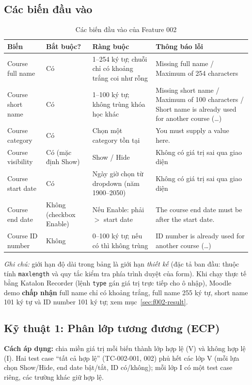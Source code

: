 \subsection{Các biến đầu vào}
\begin{table}[H]
\centering\small
\begin{tabular}{|L{2.8cm}|L{1.8cm}|L{5.0cm}|L{4.4cm}|}
\hline
{}\textbf{Biến} & \textbf{Bắt buộc?} & \textbf{Ràng buộc} & \textbf{Thông báo lỗi} \\ \hline
Course full name & Có & 1--254 ký tự; chuỗi chỉ có khoảng trắng coi như rỗng & Missing full name / Maximum of 254 characters \\ \hline
Course short name & Có & 1--100 ký tự; không trùng khóa học khác & Missing short name / Maximum of 100 characters / Short name is already used for another course (\dots) \\ \hline
Course category & Có & Chọn một category tồn tại & You must supply a value here. \\ \hline
Course visibility & Có (mặc định Show) & Show / Hide & Không có giá trị sai qua giao diện \\ \hline
Course start date & Có & Ngày giờ chọn từ dropdown (năm 1900--2050) & Không có giá trị sai qua giao diện \\ \hline
Course end date & Không (checkbox Enable) & Nếu Enable: phải $>$ start date & The course end date must be after the start date. \\ \hline
Course ID number & Không & 0--100 ký tự; nếu có thì không trùng & ID number is already used for another course (\dots) \\ \hline
\end{tabular}
\caption{Các biến đầu vào của Feature 002}
\end{table}
\textit{Ghi chú:} giới hạn độ dài trong bảng là giới hạn \emph{thiết kế} (đặc tả ban đầu: thuộc tính \texttt{maxlength} và quy tắc
kiểm tra phía trình duyệt của form). Khi chạy thực tế bằng Katalon Recorder (lệnh \texttt{type} gán giá trị trực tiếp cho ô nhập),
Moodle demo \textbf{chấp nhận} full name chỉ có khoảng trắng, full name 255 ký tự, short name 101 ký tự và ID number 101 ký tự;
xem mục~\ref{sec:f002-result}.

\subsection{Kỹ thuật 1: Phân lớp tương đương (ECP)}
\textbf{Cách áp dụng:} chia miền giá trị mỗi biến thành lớp hợp lệ (V) và không hợp lệ (I). Hai test case ``tất cả hợp lệ''
(TC-002-001, 002) phủ hết các lớp V (mỗi lựa chọn Show/Hide, end date bật/tắt, ID có/không); mỗi lớp I có một test case riêng,
các trường khác giữ hợp lệ.

